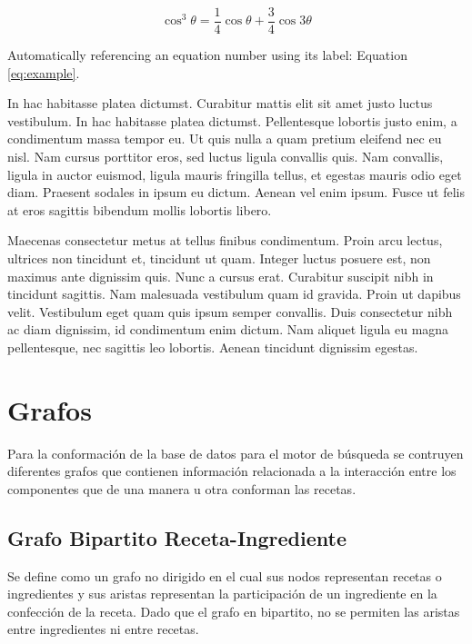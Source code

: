 \documentclass[
	a4paper, %
	10pt, %
	unnumberedsections, %
	twoside, %
]{LTJournalArticle}
\begin{document}
\begin{equation}
	\cos^3 \theta =\frac{1}{4}\cos\theta+\frac{3}{4}\cos 3\theta
	\label{eq:example}
\end{equation}

Automatically referencing an equation number using its label: Equation \ref{eq:example}.

In hac habitasse platea dictumst. Curabitur mattis elit sit amet justo luctus vestibulum. In hac habitasse platea dictumst. Pellentesque lobortis justo enim, a condimentum massa tempor eu. Ut quis nulla a quam pretium eleifend nec eu nisl. Nam cursus porttitor eros, sed luctus ligula convallis quis. Nam convallis, ligula in auctor euismod, ligula mauris fringilla tellus, et egestas mauris odio eget diam. Praesent sodales in ipsum eu dictum. Aenean vel enim ipsum. Fusce ut felis at eros sagittis bibendum mollis lobortis libero.

Maecenas consectetur metus at tellus finibus condimentum. Proin arcu lectus, ultrices non tincidunt et, tincidunt ut quam. Integer luctus posuere est, non maximus ante dignissim quis. Nunc a cursus erat. Curabitur suscipit nibh in tincidunt sagittis. Nam malesuada vestibulum quam id gravida. Proin ut dapibus velit. Vestibulum eget quam quis ipsum semper convallis. Duis consectetur nibh ac diam dignissim, id condimentum enim dictum. Nam aliquet ligula eu magna pellentesque, nec sagittis leo lobortis. Aenean tincidunt dignissim egestas.


\section{Grafos}

Para la conformación de la base de datos para el motor de búsqueda se contruyen diferentes grafos que
contienen información relacionada a la interacción entre los componentes que de una manera u otra conforman
las recetas.

\subsection{Grafo Bipartito Receta-Ingrediente}

Se define como un grafo no dirigido en el cual sus nodos representan
recetas o ingredientes y sus aristas representan la participación de un ingrediente en la confección de la receta.
Dado que el grafo en bipartito, no se permiten las aristas entre ingredientes ni entre recetas.
\end{document}
